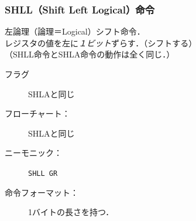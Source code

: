 \documentclass[handout]{beamer}        %
\begin{document}
\begin{frame}
  \frametitle{SHLL（Shift Left Logical）命令}
  左論理（論理＝Logical）シフト命令．\\
  レジスタの値を左に\emph{１ビット}ずらす．（シフトする）\\
  （SHLL命令とSHLA命令の動作は全く同じ．）
  \vfill
  \begin{description}
  \item[フラグ] SHLAと同じ
    \vfill
  \item[フローチャート：] SHLAと同じ
    \vfill
  \item[ニーモニック：] \texttt{SHLL GR}
    \vfill
  \item[命令フォーマット：] 1バイトの長さを持つ．\\
  \end{description}
  \vfill
\end{frame}
\end{document}
